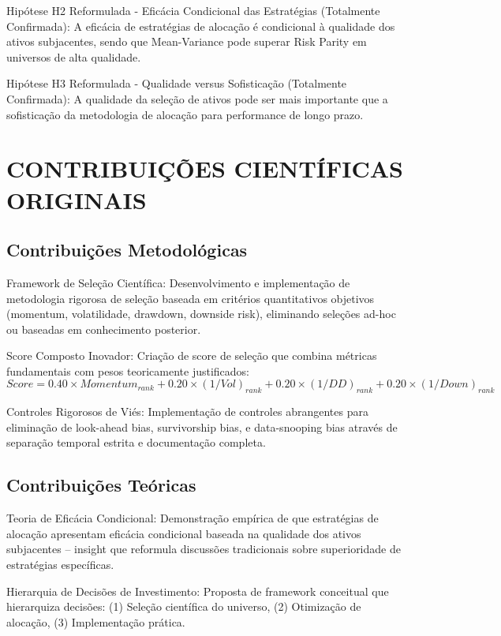 Hipótese H2 Reformulada - Eficácia Condicional das Estratégias (Totalmente Confirmada): A eficácia de estratégias de alocação é condicional à qualidade dos ativos subjacentes, sendo que Mean-Variance pode superar Risk Parity em universos de alta qualidade.

Hipótese H3 Reformulada - Qualidade versus Sofisticação (Totalmente Confirmada): A qualidade da seleção de ativos pode ser mais importante que a sofisticação da metodologia de alocação para performance de longo prazo.

\section{CONTRIBUIÇÕES CIENTÍFICAS ORIGINAIS}

\subsection{Contribuições Metodológicas}

Framework de Seleção Científica: Desenvolvimento e implementação de metodologia rigorosa de seleção baseada em critérios quantitativos objetivos (momentum, volatilidade, drawdown, downside risk), eliminando seleções ad-hoc ou baseadas em conhecimento posterior.

Score Composto Inovador: Criação de score de seleção que combina métricas fundamentais com pesos teoricamente justificados:
\begin{equation}
Score = 0.40 \times Momentum_{rank} + 0.20 \times (1/Vol)_{rank} + 0.20 \times (1/DD)_{rank} + 0.20 \times (1/Down)_{rank}
\end{equation}

Controles Rigorosos de Viés: Implementação de controles abrangentes para eliminação de look-ahead bias, survivorship bias, e data-snooping bias através de separação temporal estrita e documentação completa.

\subsection{Contribuições Teóricas}

Teoria de Eficácia Condicional: Demonstração empírica de que estratégias de alocação apresentam eficácia condicional baseada na qualidade dos ativos subjacentes – insight que reformula discussões tradicionais sobre superioridade de estratégias específicas.

Hierarquia de Decisões de Investimento: Proposta de framework conceitual que hierarquiza decisões: (1) Seleção científica do universo, (2) Otimização de alocação, (3) Implementação prática.

